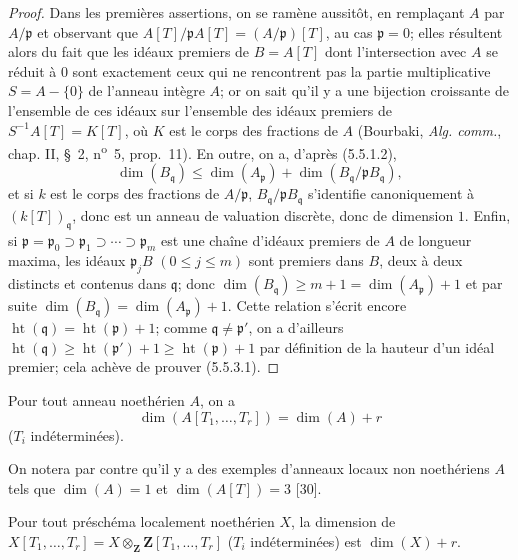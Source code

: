 \begin{proof}
Dans les premières assertions, on se ramène aussitôt, en remplaçant $A$ par
$A/\mathfrak p$ et observant que
$A[T]/\mathfrak pA[T]=(A/\mathfrak p)[T]$, au cas $\mathfrak p=0$; elles
résultent alors du fait que les idéaux premiers de $B=A[T]$ dont
l'intersection avec $A$ se réduit à $0$ sont exactement ceux qui ne
rencontrent pas la partie multiplicative $S=A-\{0\}$ de l'anneau intègre
$A$; or on sait qu'il y a une bijection croissante de l'ensemble de ces
idéaux sur l'ensemble des idéaux premiers de $S^{-1}A[T]=K[T]$, où $K$ est
le corps des fractions de $A$ (Bourbaki, \emph{Alg. comm.}, chap. II,
\S~2, n\textsuperscript{o}~5, prop.~11). En outre, on a, d'après (5.5.1.2),
\[
\dim(B_{\mathfrak q})\leq\dim(A_{\mathfrak p})
+\dim(B_{\mathfrak q}/\mathfrak pB_{\mathfrak q}),
\]
et si $k$ est le corps des fractions de $A/\mathfrak p$,
$B_{\mathfrak q}/\mathfrak pB_{\mathfrak q}$ s'identifie canoniquement à
$(k[T])_{\mathfrak q}$, donc est un anneau de valuation discrète, donc de
dimension $1$. Enfin, si
$\mathfrak p=\mathfrak p_0\supset\mathfrak p_1\supset\cdots
\supset\mathfrak p_m$ est une chaîne d'idéaux premiers de $A$ de longueur
maxima, les idéaux $\mathfrak p_jB$ $(0\leq j\leq m)$ sont premiers dans
$B$, deux à deux distincts et contenus dans $\mathfrak q$; donc
$\dim(B_{\mathfrak q})\geq m+1=\dim(A_{\mathfrak p})+1$ et par suite
$\dim(B_{\mathfrak q})=\dim(A_{\mathfrak p})+1$. Cette relation s'écrit
encore $\operatorname{ht}(\mathfrak q)=\operatorname{ht}(\mathfrak p)+1$;
comme $\mathfrak q\ne\mathfrak p'$, on a d'ailleurs
$\operatorname{ht}(\mathfrak q)\geq\operatorname{ht}(\mathfrak p')+1
\geq\operatorname{ht}(\mathfrak p)+1$ par définition de la hauteur d'un
idéal premier; cela achève de prouver (5.5.3.1).
\end{proof}

\begin{corollary}[5.5.4]
\label{IV.2.s5.5.4-fr}
Pour tout anneau noethérien $A$, on a
\begin{equation}
\dim(A[T_1,\ldots,T_r])=\dim(A)+r
\tag{5.5.4.1}\label{IV.2.s5.5.4.1-fr}
\end{equation}
($T_i$ indéterminées).
\end{corollary}

On notera par contre qu'il y a des exemples d'anneaux locaux non noethériens
$A$ tels que $\dim(A)=1$ et $\dim(A[T])=3$ [30].

\begin{corollary}[5.5.5]
\label{IV.2.s5.5.5-fr}
Pour tout préschéma localement noethérien $X$, la dimension de
$X[T_1,\ldots,T_r]=X\otimes_{\mathbf Z}\mathbf Z[T_1,\ldots,T_r]$
($T_i$ indéterminées) est $\dim(X)+r$.
\end{corollary}

